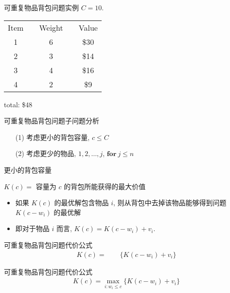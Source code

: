 \documentclass[fontset=fandol,UTF8,fleqn]{beamer}
\begin{document}
\begin{frame}{可重复物品背包问题实例}
$C = 10$.  
\begin{table}
  \centering
  \begin{tabular}{ccccc}
Item & & Weight & & Value \\
1 & & 6 & & \$30 \\
2 & & 3 &  & \$14 \\
3 & & 4 & & \$16 \\
4 & &  2 &  & \$9    
  \end{tabular}
\end{table} \pause
total: \$48  
\end{frame}

\begin{frame}{可重复物品背包问题子问题分析}
      \begin{itemize}[<+-|alert@+>]
\item[(1)] 考虑更小的背包容量, $c \leq C$   
\item[(2)] 考虑更少的物品, $1,2,\ldots, j$, $\mathbf{for}\ j \leq n$   
\end{itemize}
\end{frame}

\begin{frame}{更小的背包容量}
\begin{center}
  $K(c) = $ 容量为 $c$ 的背包所能获得的最大价值
\end{center}
    \begin{itemize}[<+-|alert@+>]
\item 如果 $K(c)$ 的最优解包含物品 $i$, 则从背包中去掉该物品能够得到问题 $K(c-w_i)$ 的最优解  
\item 即对于物品 $i$ 而言, $K(c)=K(c-w_i)+v_i$.  
\end{itemize}
\end{frame}

\begin{frame}{可重复物品背包问题代价公式}
\begin{eqnarray*}
      K(c)=\qquad \{K(c-w_i)+v_i\} 
\end{eqnarray*}
\end{frame}

\begin{frame}{可重复物品背包问题代价公式}
\begin{eqnarray*}
      K(c)=\max\limits_{i:w_i\leq c}\{K(c-w_i)+v_i\} 
\end{eqnarray*}
\end{frame}
\end{document}
